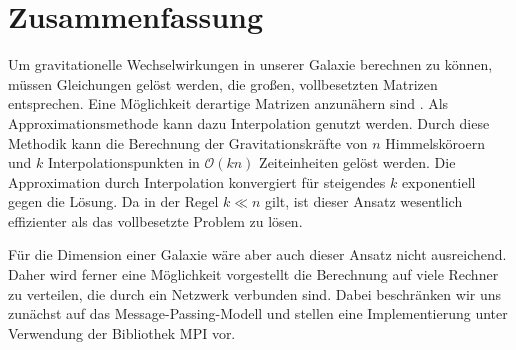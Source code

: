 \chapter*{Zusammenfassung}
  Um gravitationelle Wechselwirkungen in unserer Galaxie berechnen zu können, müssen Gleichungen gelöst werden, die großen, vollbesetzten Matrizen entsprechen. Eine Möglichkeit derartige Matrizen
  anzunähern sind \hquad. Als Approximationsmethode kann dazu Interpolation genutzt werden. Durch diese Methodik kann die Berechnung der Gravitationskräfte von $n$ Himmelsköroern und $k$ 
  Interpolationspunkten in $\mathcal{O}(kn)$ Zeiteinheiten gelöst werden. Die Approximation durch Interpolation konvergiert für steigendes $k$ exponentiell gegen die Lösung. 
  Da in der Regel $k \ll n$ gilt, ist dieser Ansatz wesentlich effizienter als das vollbesetzte Problem zu lösen.
  
  Für die Dimension einer Galaxie wäre aber auch dieser Ansatz nicht ausreichend. Daher wird ferner eine Möglichkeit vorgestellt die Berechnung auf viele Rechner zu verteilen, die durch ein 
  Netzwerk verbunden sind. Dabei beschränken wir uns zunächst auf das Message-Passing-Modell und stellen eine Implementierung unter Verwendung der Bibliothek MPI vor.